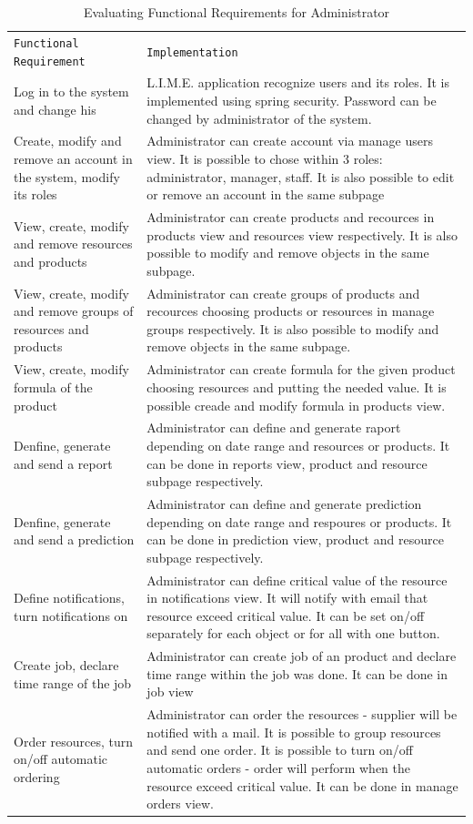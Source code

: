 \documentclass[a4paper,11pt,twoside]{report}
\theoremstyle{definition}
\begin{document}
\begin{longtable}{|p{4cm}|p{12cm}|}
\caption[Evaluating Functional Requirements for Administrator]{Evaluating Functional Requirements for Administrator}
\label{Evaluating Functional Requirements for Administrator}
\centering
\tabularnewline

\hline
\texttt{Functional Requirement} & \texttt{Implementation} \\ \hline
Log in to the system and change his & L.I.M.E. application recognize users and its roles. It is implemented using spring security. Password can be changed by administrator of the system. \\ \hline
Create, modify and remove an account in the system, modify its roles & Administrator can create account via manage users view. It is possible to chose within 3 roles: administrator, manager, staff. It is also possible to edit or remove an account in the same subpage \\ \hline
View, create, modify and remove resources and products & Administrator can create products and recources in products view and resources view respectively. It is also possible to modify and remove objects in the same subpage. \\ \hline
View, create, modify and remove groups of resources and products & Administrator can create groups of products and recources choosing products or resources in manage groups respectively. It is also possible to modify and remove objects in the same subpage. \\ \hline
View, create, modify formula of the product & Administrator can create formula for the given product choosing resources and putting the needed value. It is possible creade and modify formula in products view. \\ \hline
Denfine, generate and send a report & Administrator can define and generate raport depending on date range and resources or products. It can be done in reports view, product and resource subpage respectively. \\ \hline
Denfine, generate and send a prediction & Administrator can define and generate prediction depending on date range and respoures or products. It can be done in prediction view, product and resource subpage respectively. \\ \hline
Define notifications, turn notifications on & Administrator can define critical value of the resource in notifications view. It will notify with email that resource exceed critical value. It can be set on/off separately for each object or for all with one button. \\ \hline
Create job, declare time range of the job & Administrator can create job of an product and declare time range within the job was done. It can be done in job view \\ \hline
Order resources, turn on/off automatic ordering & Administrator can order the resources - supplier will be notified with a mail. It is possible to group resources and send one order. It is possible to turn on/off automatic orders - order will perform when the resource exceed critical value. It can be done in manage orders view. \\ \hline



\end{longtable}
\end{document}
